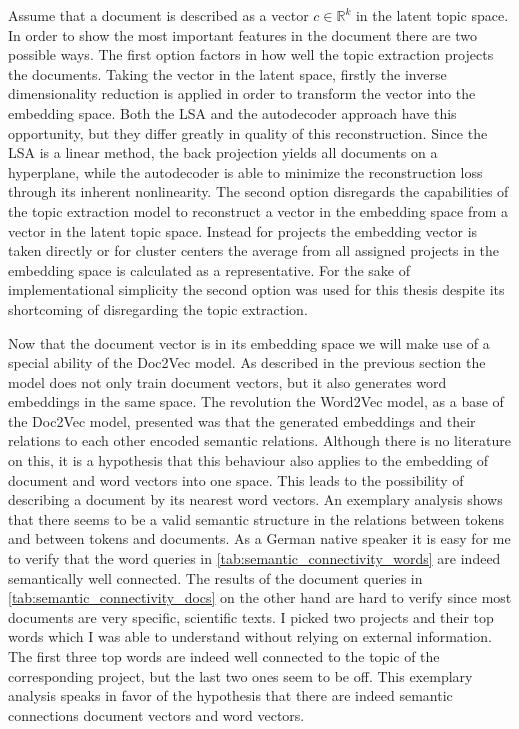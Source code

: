 Assume that a document is described as a vector $c \in \mathbb{R}^k$ in the latent topic space. In order to show the most important features in the document there are two possible ways. The first option factors in how well the topic extraction projects the documents. Taking the vector in the latent space, firstly the inverse dimensionality reduction is applied in order to transform the vector into the embedding space. Both the LSA and the autodecoder approach have this opportunity, but they differ greatly in quality of this reconstruction. Since the LSA is a linear method, the back projection yields all documents on a hyperplane, while the autodecoder is able to minimize the reconstruction loss through its inherent nonlinearity. 
The second option disregards the capabilities of the topic extraction model to reconstruct a vector in the embedding space from a vector in the latent topic space. Instead for projects the embedding vector is taken directly or for cluster centers the average from all assigned projects in the embedding space is calculated as a representative. For the sake of implementational simplicity the second option was used for this thesis despite its shortcoming of disregarding the topic extraction.

Now that the document vector is in its embedding space we will make use of a special ability of the Doc2Vec model. As described in the previous section the model does not only train document vectors, but it also generates word embeddings in the same space. The revolution the Word2Vec model, as a base of the Doc2Vec model, presented was that the generated embeddings and their relations to each other encoded semantic relations. Although there is no literature on this, it is a hypothesis that this behaviour also applies to the embedding of document and word vectors into one space. This leads to the possibility of describing a document by its nearest word vectors. An exemplary analysis shows that there seems to be a valid semantic structure in the relations between tokens and between tokens and documents. As a German native speaker it is easy for me to verify that the word queries in \autoref{tab:semantic_connectivity_words} are indeed semantically well connected. The results of the document queries in \autoref{tab:semantic_connectivity_docs} on the other hand are hard to verify since most documents are very specific, scientific texts. I picked two projects and their top words which I was able to understand without relying on external information. The first three top words are indeed well connected to the topic of the corresponding project, but the last two ones seem to be off. This exemplary analysis speaks in favor of the hypothesis that there are indeed semantic connections document vectors and word vectors.

